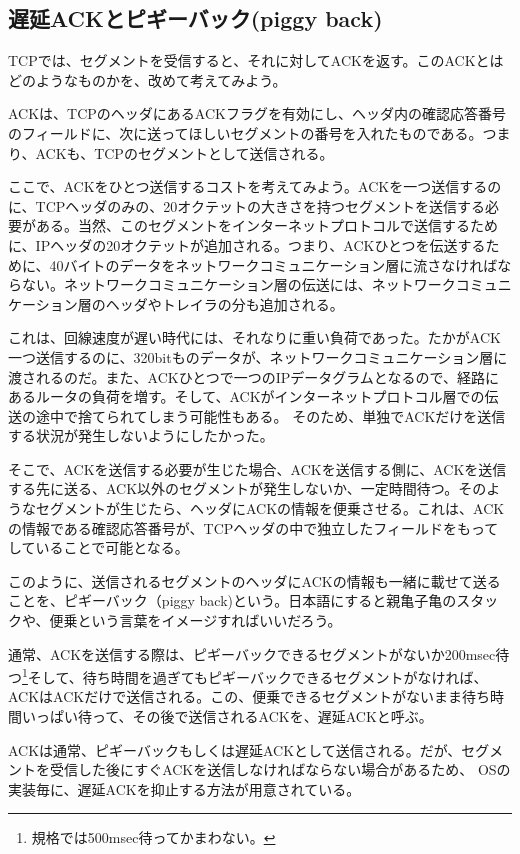 \subsection{遅延ACKとピギーバック(piggy back)}


TCPでは、セグメントを受信すると、それに対してACKを返す。このACKとはどのようなものかを、改めて考えてみよう。

ACKは、TCPのヘッダにあるACKフラグを有効にし、ヘッダ内の確認応答番号のフィールドに、次に送ってほしいセグメントの番号を入れたものである。つまり、ACKも、TCPのセグメントとして送信される。

ここで、ACKをひとつ送信するコストを考えてみよう。ACKを一つ送信するのに、TCPヘッダのみの、20オクテットの大きさを持つセグメントを送信する必要がある。当然、このセグメントをインターネットプロトコルで送信するために、IPヘッダの20オクテットが追加される。つまり、ACKひとつを伝送するために、40バイトのデータをネットワークコミュニケーション層に流さなければならない。ネットワークコミュニケーション層の伝送には、ネットワークコミュニケーション層のヘッダやトレイラの分も追加される。

これは、回線速度が遅い時代には、それなりに重い負荷であった。たかがACK一つ送信するのに、320bitものデータが、ネットワークコミュニケーション層に渡されるのだ。また、ACKひとつで一つのIPデータグラムとなるので、経路にあるルータの負荷を増す。そして、ACKがインターネットプロトコル層での伝送の途中で捨てられてしまう可能性もある。
そのため、単独でACKだけを送信する状況が発生しないようにしたかった。

そこで、ACKを送信する必要が生じた場合、ACKを送信する側に、ACKを送信する先に送る、ACK以外のセグメントが発生しないか、一定時間待つ。そのようなセグメントが生じたら、ヘッダにACKの情報を便乗させる。これは、ACKの情報である確認応答番号が、TCPヘッダの中で独立したフィールドをもってしていることで可能となる。

このように、送信されるセグメントのヘッダにACKの情報も一緒に載せて送ることを、ピギーバック（piggy back)という。日本語にすると親亀子亀のスタックや、便乗という言葉をイメージすればいいだろう。

通常、ACKを送信する際は、ピギーバックできるセグメントがないか200msec待つ\footnote{規格では500msec待ってかまわない。}そして、待ち時間を過ぎてもピギーバックできるセグメントがなければ、ACKはACKだけで送信される。この、便乗できるセグメントがないまま待ち時間いっぱい待って、その後で送信されるACKを、遅延ACKと呼ぶ。

ACKは通常、ピギーバックもしくは遅延ACKとして送信される。だが、セグメントを受信した後にすぐACKを送信しなければならない場合があるため、 OSの実装毎に、遅延ACKを抑止する方法が用意されている。


